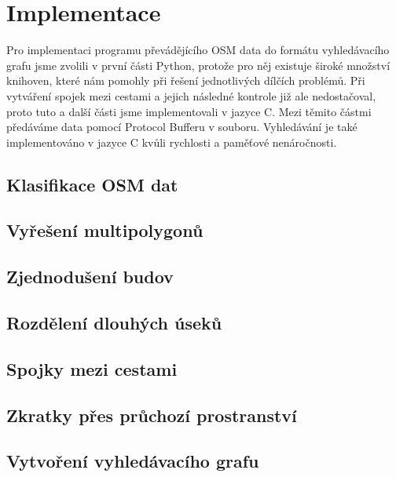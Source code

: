 \chapter{Implementace}
Pro implementaci programu převádějícího OSM data do formátu vyhledávacího grafu
jsme zvolili v první části Python, protože pro něj existuje široké množství
knihoven, které nám pomohly při řešení jednotlivých dílčích problémů. Při
vytváření spojek mezi cestami a jejich následné kontrole již ale nedostačoval,
proto tuto a další části jsme implementovali v jazyce C. Mezi těmito částmi
předáváme data pomocí Protocol Bufferu v souboru. Vyhledávání je také
implementováno v jazyce C kvůli rychlosti a paměťové nenáročnosti.

\section{Klasifikace OSM dat}
\section{Vyřešení multipolygonů}
\section{Zjednodušení budov}
\section{Rozdělení dlouhých úseků}
\section{Spojky mezi cestami}
\section{Zkratky přes průchozí prostranství}
\section{Vytvoření vyhledávacího grafu}
